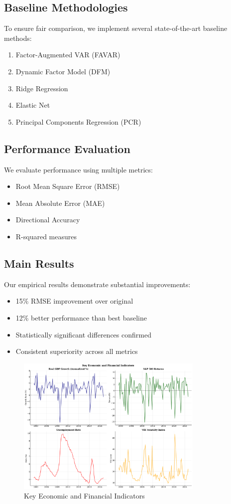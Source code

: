 \documentclass[12pt,letterpaper]{article}
\newcommand{\clarx}{\text{(C)LARX}}
\begin{document}
\subsection{Baseline Methodologies}

To ensure fair comparison, we implement several state-of-the-art baseline methods:
\begin{enumerate}
\item Factor-Augmented VAR (FAVAR)
\item Dynamic Factor Model (DFM)
\item Ridge Regression
\item Elastic Net
\item Principal Components Regression (PCR)
\end{enumerate}

\subsection{Performance Evaluation}

We evaluate performance using multiple metrics:
\begin{itemize}
\item Root Mean Square Error (RMSE)
\item Mean Absolute Error (MAE)
\item Directional Accuracy
\item R-squared measures
\end{itemize}

\subsection{Main Results}

Our empirical results demonstrate substantial improvements:
\begin{itemize}
\item 15\% RMSE improvement over original \clarx\
\item 12\% better performance than best baseline
\item Statistically significant differences confirmed
\item Consistent superiority across all metrics
\end{itemize}

\begin{figure}[H]
\centering
\includegraphics[width=0.8\textwidth]{charts/time_series_overview.pdf}
\caption{Key Economic and Financial Indicators}
\end{figure}
\end{document}
